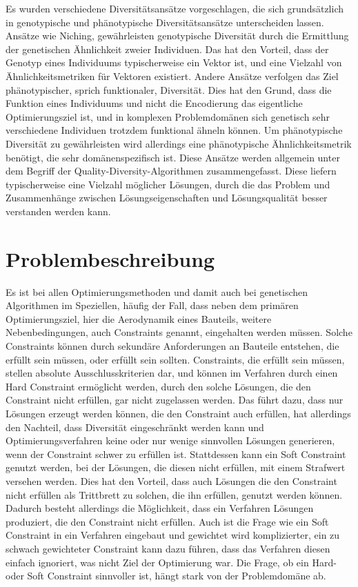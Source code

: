 \documentclass[12pt]{article}
\begin{document}
Es wurden verschiedene Diversitätsansätze vorgeschlagen, die sich grundsätzlich in genotypische und phänotypische Diversitätsansätze unterscheiden lassen.
Ansätze wie Niching, gewährleisten genotypische Diversität durch die Ermittlung der genetischen Ähnlichkeit zweier Individuen.
Das hat den Vorteil, dass der Genotyp eines Individuums typischerweise ein Vektor ist, und eine Vielzahl von Ähnlichkeitsmetriken für Vektoren existiert.
Andere Ansätze verfolgen das Ziel phänotypischer, sprich funktionaler, Diversität.
Dies hat den Grund, dass die Funktion eines Individuums und nicht die Encodierung das eigentliche Optimierungsziel ist,
und in komplexen Problemdomänen sich genetisch sehr verschiedene Individuen trotzdem funktional ähneln können.
Um phänotypische Diversität zu gewährleisten wird allerdings eine phänotypische Ähnlichkeitsmetrik benötigt, die sehr domänenspezifisch ist.
Diese Ansätze werden allgemein unter dem Begriff der Quality-Diversity-Algorithmen zusammengefasst.
Diese liefern typischerweise eine Vielzahl möglicher Lösungen, durch die das Problem und Zusammenhänge zwischen Lösungseigenschaften und Lösungsqualität besser verstanden werden kann.



\section{Problembeschreibung}

Es ist bei allen Optimierungsmethoden und damit auch bei genetischen Algorithmen im Speziellen, häufig der Fall, dass neben dem primären Optimierungsziel, hier die Aerodynamik eines Bauteils, weitere Nebenbedingungen, auch Constraints genannt, eingehalten werden müssen.
Solche Constraints können durch sekundäre Anforderungen an Bauteile entstehen, die erfüllt sein müssen, oder erfüllt sein sollten.
Constraints, die erfüllt sein müssen, stellen absolute Ausschlusskriterien dar, und können im Verfahren durch einen Hard Constraint ermöglicht werden, durch den solche Lösungen, die den Constraint nicht erfüllen, gar nicht zugelassen werden.
Das führt dazu, dass nur Lösungen erzeugt werden können, die den Constraint auch erfüllen, hat allerdings den Nachteil, dass Diversität eingeschränkt werden kann und Optimierungsverfahren keine oder nur wenige sinnvollen Lösungen generieren, wenn der Constraint schwer zu erfüllen ist.
Stattdessen kann ein Soft Constraint genutzt werden, bei der Lösungen, die diesen nicht erfüllen, mit einem Strafwert versehen werden.
Dies hat den Vorteil, dass auch Lösungen die den Constraint nicht erfüllen als Trittbrett zu solchen, die ihn erfüllen, genutzt werden können.
Dadurch besteht allerdings die Möglichkeit, dass ein Verfahren Lösungen produziert, die den Constraint nicht erfüllen.
Auch ist die Frage wie ein Soft Constraint in ein Verfahren eingebaut und gewichtet wird komplizierter, ein zu schwach gewichteter Constraint kann dazu führen, dass das Verfahren diesen einfach ignoriert, was nicht Ziel der Optimierung war.
Die Frage, ob ein Hard- oder Soft Constraint sinnvoller ist, hängt stark von der Problemdomäne ab.
\end{document}

